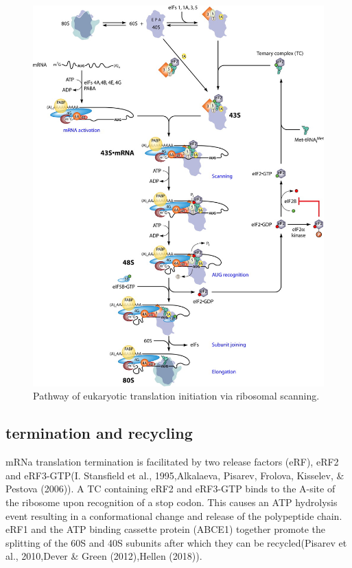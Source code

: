 \documentclass[12pt,openany]{book}
\begin{document}
\begin{figure}[ht]
\includegraphics{./figures/initiation.jpg} 
  \caption{Pathway of eukaryotic translation initiation via ribosomal scanning.
  \label{fig:initiation}}
\end{figure}

\clearpage

\subsection{termination and recycling}

mRNa translation termination is facilitated by two release factors
(eRF), eRF2 and eRF3-GTP(I. Stansfield et al., 1995,Alkalaeva, Pisarev,
Frolova, Kisselev, \& Pestova (2006)). A TC containing eRF2 and eRF3-GTP
binds to the A-site of the ribosome upon recognition of a stop codon.
This causes an ATP hydrolysis event resulting in a conformational change
and release of the polypeptide chain. eRF1 and the ATP binding cassette
protein (ABCE1) together promote the splitting of the 60S and 40S
subunits after which they can be recycled(Pisarev et al., 2010,Dever \&
Green (2012),Hellen (2018)).
\end{document}
